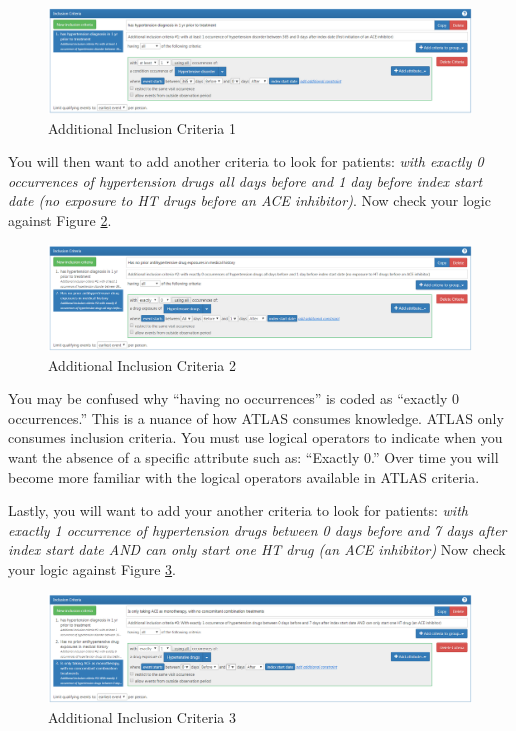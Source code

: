 \documentclass[11pt]{book}
\theoremstyle{definition}
\theoremstyle{definition}
\theoremstyle{definition}
\theoremstyle{remark}
\begin{document}
\begin{figure}

{\centering \includegraphics[width=0.9\linewidth]{images/Cohorts/ATLAS-IC1} 

}

\caption{Additional Inclusion Criteria 1}\label{fig:ATLASIC1}
\end{figure}

You will then want to add another criteria to look for patients: \emph{with exactly 0 occurrences of hypertension drugs all days before and 1 day before index start date (no exposure to HT drugs before an ACE inhibitor)}. Now check your logic against Figure \ref{fig:ATLASIC2}.

\begin{figure}

{\centering \includegraphics[width=0.9\linewidth]{images/Cohorts/ATLAS-IC2} 

}

\caption{Additional Inclusion Criteria 2}\label{fig:ATLASIC2}
\end{figure}

You may be confused why ``having no occurrences'' is coded as ``exactly 0 occurrences.'' This is a nuance of how ATLAS consumes knowledge. ATLAS only consumes inclusion criteria. You must use logical operators to indicate when you want the absence of a specific attribute such as: ``Exactly 0.'' Over time you will become more familiar with the logical operators available in ATLAS criteria.

Lastly, you will want to add your another criteria to look for patients: \emph{with exactly 1 occurrence of hypertension drugs between 0 days before and 7 days after index start date AND can only start one HT drug (an ACE inhibitor)} Now check your logic against Figure \ref{fig:ATLASIC3}.

\begin{figure}

{\centering \includegraphics[width=0.9\linewidth]{images/Cohorts/ATLAS-IC3} 

}

\caption{Additional Inclusion Criteria 3}\label{fig:ATLASIC3}
\end{figure}
\end{document}
